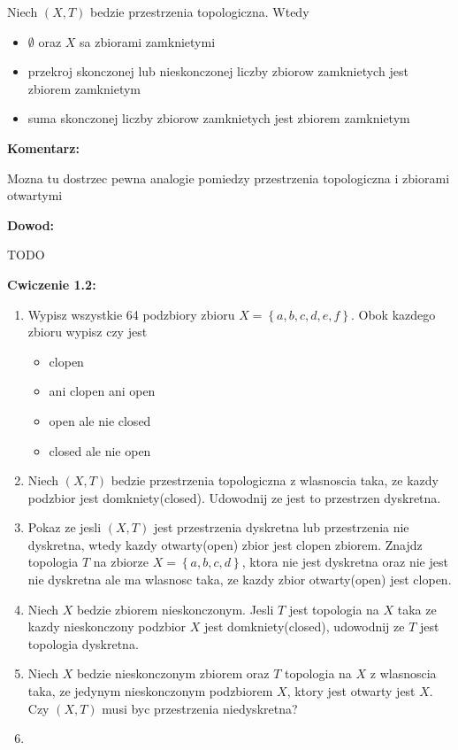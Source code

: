 \documentclass{article}
\begin{document}
\begin{tcolorbox}[colback=white!90!green,colframe=black!35!green,title=1.2.5 Lemat: Przestrzen topologiczna i zbiory zamkniete]

Niech $(X,T)$ bedzie przestrzenia topologiczna. Wtedy

\begin{itemize}%
\item $\emptyset$ oraz $X$ sa zbiorami zamknietymi
\item przekroj skonczonej lub nieskonczonej liczby zbiorow zamknietych jest zbiorem zamknietym
\item suma skonczonej liczby zbiorow zamknietych jest zbiorem zamknietym
    
\end{itemize}%
\end{tcolorbox}
\textbf{Komentarz:}

Mozna tu dostrzec pewna analogie pomiedzy przestrzenia topologiczna i zbiorami otwartymi

\textbf{Dowod:}

TODO

\hrulefill
\textbf{Cwiczenie 1.2:}
\begin{enumerate}

\item Wypisz wszystkie 64 podzbiory zbioru $X = \left\{a,b,c,d,e,f \right\}$. Obok kazdego zbioru wypisz czy jest 
    \begin{itemize}
        \item clopen
        \item ani clopen ani open
        \item open ale nie closed
        \item closed ale nie open
    \end{itemize}
\item Niech $(X,T)$ bedzie przestrzenia topologiczna z wlasnoscia taka, ze kazdy podzbior jest domkniety(closed). Udowodnij ze jest to przestrzen dyskretna.
\item Pokaz ze jesli $(X,T)$ jest przestrzenia dyskretna lub przestrzenia nie dyskretna, wtedy kazdy otwarty(open) zbior jest clopen zbiorem. Znajdz topologia $T$ na zbiorze $X = \left\{ a,b,c,d \right\}$, ktora nie jest dyskretna oraz nie jest nie dyskretna ale ma wlasnosc taka, ze kazdy zbior otwarty(open) jest clopen.
\item Niech $X$ bedzie zbiorem nieskonczonym. Jesli $T$ jest topologia na $X$ taka ze kazdy nieskonczony podzbior $X$ jest domkniety(closed), udowodnij ze $T$ jest topologia dyskretna.
\item Niech $X$ bedzie nieskonczonym zbiorem oraz $T$ topologia na $X$ z wlasnoscia taka, ze jedynym nieskonczonym podzbiorem $X$, ktory jest otwarty jest $X$. Czy $(X, T)$ musi byc przestrzenia niedyskretna?
\item 
\end{enumerate}
\end{document}
